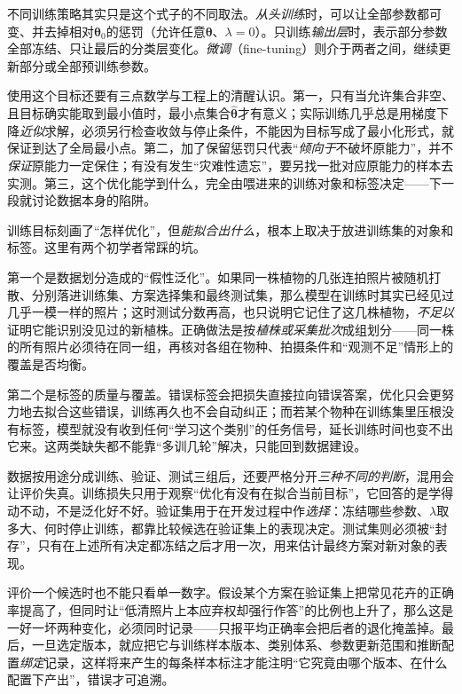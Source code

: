 不同训练策略其实只是这个式子的不同取法。\emph{从头训练}时，可以让全部参数都可变、并去掉相对$\bm{\theta}_0$的惩罚（允许任意$\bm{\theta}$、$\lambda=0$）。只训练\emph{输出层}时，表示部分参数全部冻结、只让最后的分类层变化。\emph{微调}（fine-tuning）则介于两者之间，继续更新部分或全部预训练参数。

使用这个目标还要有三点数学与工程上的清醒认识。第一，只有当允许集合非空、且目标确实能取到最小值时，最小点集合$\widehat{\bm{\theta}}$才有意义；实际训练几乎总是用梯度下降\emph{近似}求解，必须另行检查收敛与停止条件，不能因为目标写成了最小化形式，就保证到达了全局最小点。第二，加了保留惩罚只代表“\emph{倾向于}不破坏原能力”，并不\emph{保证}原能力一定保住；有没有发生“灾难性遗忘”，要另找一批对应原能力的样本去实测。第三，这个优化能学到什么，完全由喂进来的训练对象和标签决定——下一段就讨论数据本身的陷阱。

训练目标刻画了“怎样优化”，但\emph{能拟合出什么}，根本上取决于放进训练集的对象和标签。这里有两个初学者常踩的坑。

第一个是数据划分造成的“假性泛化”。如果同一株植物的几张连拍照片被随机打散、分别落进训练集、方案选择集和最终测试集，那么模型在训练时其实已经见过几乎一模一样的照片；这时测试分数再高，也只说明它记住了这几株植物，\emph{不足以}证明它能识别没见过的新植株。正确做法是按\emph{植株或采集批次}成组划分——同一株的所有照片必须待在同一组，再核对各组在物种、拍摄条件和“观测不足”情形上的覆盖是否均衡。

第二个是标签的质量与覆盖。错误标签会把损失直接拉向错误答案，优化只会更努力地去拟合这些错误，训练再久也不会自动纠正；而若某个物种在训练集里压根没有标签，模型就没有收到任何“学习这个类别”的任务信号，延长训练时间也变不出它来。这两类缺失都不能靠“多训几轮”解决，只能回到数据建设。

数据按用途分成训练、验证、测试三组后，还要严格分开\emph{三种不同的判断}，混用会让评价失真。训练损失只用于观察“优化有没有在拟合当前目标”，它回答的是学得动不动，不是泛化好不好。验证集用于在开发过程中作\emph{选择}：冻结哪些参数、$\lambda$取多大、何时停止训练，都靠比较候选在验证集上的表现决定。测试集则必须被“封存”，只有在上述所有决定都冻结之后才用一次，用来估计最终方案对新对象的表现。

评价一个候选时也不能只看单一数字。假设某个方案在验证集上把常见花卉的正确率提高了，但同时让“低清照片上本应弃权却强行作答”的比例也上升了，那么这是一好一坏两种变化，必须同时记录——只报平均正确率会把后者的退化掩盖掉。最后，一旦选定版本，就应把它与训练样本版本、类别体系、参数更新范围和推断配置\emph{绑定}记录，这样将来产生的每条样本标注才能注明“它究竟由哪个版本、在什么配置下产出”，错误才可追溯。

